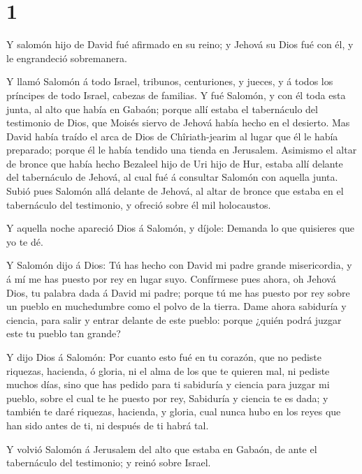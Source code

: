 \hypertarget{section}{%
\section{1}\label{section}}

 Y salomón hijo de David fué afirmado en su reino; y Jehová
su Dios fué con él, y le engrandeció sobremanera.

 Y llamó Salomón á todo Israel, tribunos, centuriones, y
jueces, y á todos los príncipes de todo Israel, cabezas de familias.
 Y fué Salomón, y con él toda esta junta, al alto que había
en Gabaón; porque allí estaba el tabernáculo del testimonio de Dios, que
Moisés siervo de Jehová había hecho en el desierto.  Mas
David había traído el arca de Dios de Chîriath-jearim al lugar que él le
había preparado; porque él le había tendido una tienda en Jerusalem.
 Asimismo el altar de bronce que había hecho Bezaleel hijo
de Uri hijo de Hur, estaba allí delante del tabernáculo de Jehová, al
cual fué á consultar Salomón con aquella junta.  Subió pues
Salomón allá delante de Jehová, al altar de bronce que estaba en el
tabernáculo del testimonio, y ofreció sobre él mil holocaustos.

 Y aquella noche apareció Dios á Salomón, y díjole: Demanda
lo que quisieres que yo te dé.

 Y Salomón dijo á Dios: Tú has hecho con David mi padre
grande misericordia, y á mí me has puesto por rey en lugar suyo.
 Confírmese pues ahora, oh Jehová Dios, tu palabra dada á
David mi padre; porque tú me has puesto por rey sobre un pueblo en
muchedumbre como el polvo de la tierra.  Dame ahora
sabiduría y ciencia, para salir y entrar delante de este pueblo: porque
¿quién podrá juzgar este tu pueblo tan grande?

 Y dijo Dios á Salomón: Por cuanto esto fué en tu corazón,
que no pediste riquezas, hacienda, ó gloria, ni el alma de los que te
quieren mal, ni pediste muchos días, sino que has pedido para ti
sabiduría y ciencia para juzgar mi pueblo, sobre el cual te he puesto
por rey,  Sabiduría y ciencia te es dada; y también te daré
riquezas, hacienda, y gloria, cual nunca hubo en los reyes que han sido
antes de ti, ni después de ti habrá tal.

 Y volvió Salomón á Jerusalem del alto que estaba en
Gabaón, de ante el tabernáculo del testimonio; y reinó sobre Israel.

